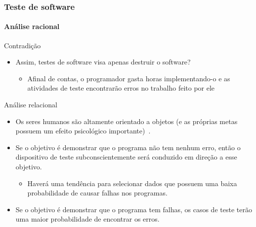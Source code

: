 \begin{frame}
\frametitle{Teste de software}
\framesubtitle{Análise racional}

\begin{block:fact}{Contradição}
\begin{itemize}
	\item Assim, testes de software visa apenas destruir o software?
	\begin{itemize}
		\item Afinal de contas, o programador gasta horas implementando-o e as atividades de teste encontrarão erros no trabalho feito por ele
	\end{itemize}
\end{itemize}
\end{block:fact}

\begin{block:fact}{Análise relacional}
\begin{itemize}
	\item {\small Os seres humanos são altamente orientado a objetos (e as próprias metas possuem um efeito
	psicológico importante)~\cite[p. 6]{myers:2004}.} %

	\item {\small Se o objetivo é demonstrar que o programa não tem nenhum erro, então o dispositivo de teste subconscientemente será conduzido em direção a esse objetivo.}
	\begin{itemize}
		\item{\small Haverá uma tendência para selecionar dados que possuem uma baixa probabilidade de causar falhas nos programas.}
	\end{itemize}

	\item {\small Se o objetivo é demonstrar que o programa tem falhas, os casos de teste terão uma maior probabilidade de encontrar os erros.}
\end{itemize}
\end{block:fact}
\end{frame}



